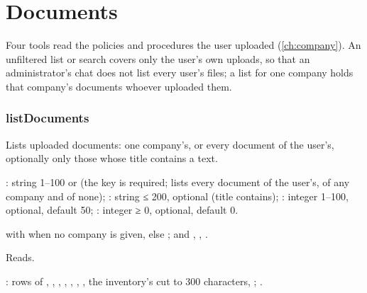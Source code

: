 \section{Documents}\label{sec:tools:documents}

Four tools read the policies and procedures the user uploaded (\cref{ch:company}). An
unfiltered list or search covers only the user's own uploads, so that an administrator's chat
does not list every user's files; a list for one company holds that company's documents
whoever uploaded them.

\subsubsection{listDocuments}\label{sec:tools:listDocuments}
\begin{description}[style=multiline, leftmargin=19mm, labelwidth=17mm, labelsep=2mm,
  font=\sffamily\bfseries\footnotesize\color{ink}, itemsep=1pt, topsep=2pt, before=\raggedright]
  \item[Does] Lists uploaded documents: one company's, or every document of the user's,
    optionally only those whose title contains a text.
  \item[Input] : string 1--100 or  (the key is required;
     lists every document of the user's, of any company and of none);
    : string ≤ 200, optional (title
    contains); : integer 1--100, optional, default 50; : integer ≥ 0,
    optional, default 0.
  \item[Calls]  with  when no company is given,
    else ; and , , .
  \item[Kind] Reads.
  \item[Returns] : rows of , , ,
    , , , , the
    inventory's  cut to 300 characters, ; .
\end{description}

